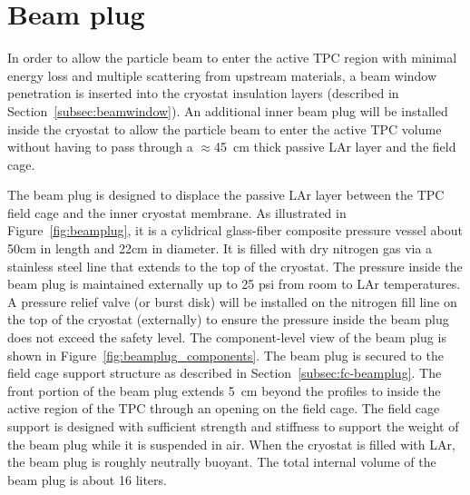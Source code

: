 \section{Beam plug}
\label{sec:beamplug}


In order to allow the particle beam to enter the active TPC region with minimal energy loss and multiple scattering from upstream materials, a beam window penetration is inserted into the cryostat insulation layers (described in Section~\ref{subsec:beamwindow}). An additional inner 
beam plug will be installed inside the cryostat to allow the particle beam to enter the active TPC volume without having to pass through 
a $\approx$45~cm thick passive LAr layer and the field cage.




The beam plug is designed to displace the passive LAr layer between the TPC field cage and the inner cryostat membrane. As illustrated in Figure~\ref{fig:beamplug}, it is a cylidrical glass-fiber composite pressure vessel about 50cm in length and  22cm in diameter. It is filled with dry nitrogen gas via a stainless steel line that extends to the top of the cryostat. The pressure inside the beam plug is maintained externally up to 25 psi from room to LAr temperatures. A pressure relief valve (or burst disk) will be installed on the nitrogen fill line on the top of the cryostat (externally) to ensure the pressure inside the beam plug does not exceed the safety level. The component-level view of the beam plug is shown in Figure~\ref{fig:beamplug_components}.  The beam plug is secured to the field cage support structure as described in Section~\ref{subsec:fc-beamplug}. The front portion of the beam plug extends 5~cm beyond the profiles to inside the active region of the TPC through an opening on the field cage. The field cage support is designed with sufficient strength and stiffness to support the weight of the beam plug while it is suspended in air. 
When the cryostat is filled with LAr, the beam plug is roughly neutrally buoyant.  The total internal volume of the beam plug is about 16 liters. 

